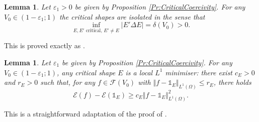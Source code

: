 \documentclass{article}
\renewcommand{\geq}{\geqslant}
\renewcommand{\leq}{\leqslant}
\def\e{{\varepsilon}}
\newtheorem{proposition}[material]{Proposition}
\newtheorem{lemma}[material]{Lemma}
\def\O{{\Omega}}
\numberwithin{equation}{section}
\begin{document}
\begin{lemma}\label{Le:CriticalIsolated}
Let $\e_1>0$ be given by Proposition \ref{Pr:CriticalCoercivity}. For any $V_0\in (1-\e_1;1)$ the critical shapes are isolated in the sense that 
\[ \inf_{E,E'\text{ critical, }E'\neq E}\left| E'\Delta E\right|=\delta(V_0)>0.\]
\end{lemma} This is proved exactly as \cite[Proposition 23]{MRB2020}.
\begin{lemma}\label{Le:CriticalMinimal}
Let $\e_1$ be given by Proposition \ref{Pr:CriticalCoercivity}. For any $V_0\in (1-\e_1;1)$, any critical shape $E$ is a local $L^1$ minimiser: there exist $c_E>0$ and $r_E>0$ such that, for any $f\in \mathcal F(V_0)$ with $\Vert f-\mathds 1_E\Vert_{L^1(\O)}\leq r_E$, there holds
\[ \mathscr E(f)-\mathscr E(\mathds 1_E)\geq c_E\Vert f-\mathds 1_E\Vert_{L^1(\O)}^2.\]
\end{lemma}
This is a straightforward adaptation of the proof of \cite[Theorem 1]{MRB2020}.
%
%


\color{black}
%
\end{document}
